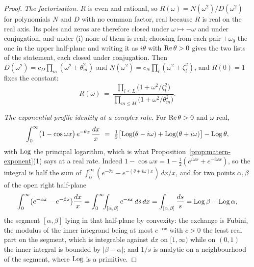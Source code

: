 \begin{proof}
\emph{The factorisation.} $R$ is even and rational, so $R(\omega) = N(\omega^2)/D(\omega^2)$ for
polynomials $N$ and $D$ with no common factor, real because $R$ is real on the real axis. Its
poles and zeros are therefore closed under $\omega \mapsto -\omega$ and under conjugation, and
under (i) none of them is real; choosing from each pair $\pm\omega_0$ the one in the upper
half-plane and writing it as $i\theta$ with $\operatorname{Re}\theta > 0$ gives the two lists of the statement,
each closed under conjugation. Then $D(\omega^2) = c_D\prod_m(\omega^2+\theta_m^2)$ and
$N(\omega^2) = c_N\prod_l(\omega^2+\zeta_l^2)$, and $R(0) = 1$ fixes the constant:
\begin{equation}\label{eq:rational-factored}
  R(\omega) \ =\ \frac{\prod_{l \le L}\bigl(1 + \omega^2/\zeta_l^2\bigr)}
                      {\prod_{m \le M}\bigl(1 + \omega^2/\theta_m^2\bigr)} .
\end{equation}

\emph{The exponential-profile identity at a complex rate.} For $\operatorname{Re}\theta > 0$ and $\omega$ real,
\begin{equation}\label{eq:complex-frullani}
  \int_0^\infty \bigl(1 - \cos\omega x\bigr)\,e^{-\theta x}\,\frac{dx}{x}
   \ =\ \tfrac12\bigl[\operatorname{Log}(\theta - i\omega) + \operatorname{Log}(\theta + i\omega)\bigr] - \operatorname{Log}\theta ,
\end{equation}
with $\operatorname{Log}$ the principal logarithm, which is what Proposition~\ref{prop:matern-exponent}(1) says
at a real rate. Indeed $1 - \cos\omega x = 1 - \tfrac12(e^{i\omega x} + e^{-i\omega x})$, so the
integral is half the sum of $\int_0^\infty(e^{-\theta x} - e^{-(\theta \mp i\omega)x})\,dx/x$, and
for two points $\alpha,\beta$ of the open right half-plane
\[
  \int_0^\infty \bigl(e^{-\alpha x} - e^{-\beta x}\bigr)\frac{dx}{x}
   = \int_0^\infty\!\!\int_{[\alpha,\beta]} e^{-sx}\,ds\,dx
   = \int_{[\alpha,\beta]}\frac{ds}{s} = \operatorname{Log}\beta - \operatorname{Log}\alpha ,
\]
the segment $[\alpha,\beta]$ lying in that half-plane by convexity: the exchange is Fubini, the
modulus of the inner integrand being at most $e^{-cx}$ with $c > 0$ the least real part on the
segment, which is integrable against $dx$ on $[1,\infty)$ while on $(0,1)$ the inner integral is
bounded by $|\beta - \alpha|$; and $1/s$ is analytic on a neighbourhood of the segment, where
$\operatorname{Log}$ is a primitive.


\end{proof}
